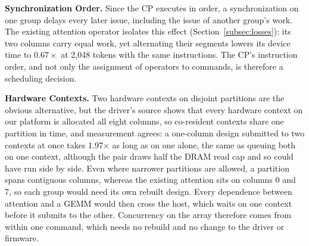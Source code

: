 \textbf{Synchronization Order.}
Since the CP executes in order, a synchronization on one group delays every later issue, including the issue of another group's work.
The existing attention operator isolates this effect (Section~\ref{subsec:losses}): its two columns carry equal work, yet alternating their segments lowers its device time to $0.67\times$ at 2{,}048 tokens with the same instructions.
The CP's instruction order, and not only the assignment of operators to commands, is therefore a scheduling decision.

\textbf{Hardware Contexts.}
Two hardware contexts on disjoint partitions are the obvious alternative, but the driver's source shows that every hardware context on our platform is allocated all eight columns, so co-resident contexts share one partition in time, and measurement agrees: a one-column design submitted to two contexts at once takes 1.97$\times$ as long as on one alone, the same as queuing both on one context, although the pair draws half the DRAM read cap and so could have run side by side.
Even where narrower partitions are allowed, a partition spans contiguous columns, whereas the existing attention sits on columns 0 and 7, so each group would need its own rebuilt design.
Every dependence between attention and a GEMM would then cross the host, which waits on one context before it submits to the other.
Concurrency on the array therefore comes from within one command, which needs no rebuild and no change to the driver or firmware.
